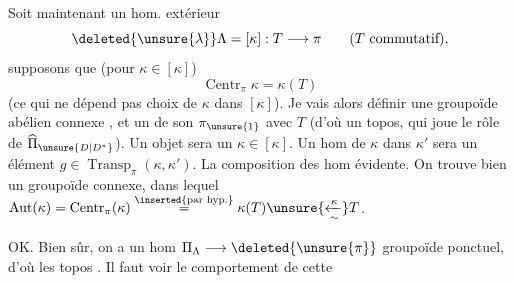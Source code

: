 Soit maintenant un hom. extérieur 
\[
\deleted{\unsure{\lambda}}\Lambda=[\kappa]:T\longrightarrow\pi
\qquad (T\text{ commutatif}),
\]
supposons que (pour \(\kappa\in[\kappa]\))
\[
\operatorname{Centr}_\pi\kappa=\kappa(T)
\]
(ce qui ne dépend pas  choix de \(\kappa\) dans
\([\kappa]\)). Je vais alors définir une
 groupoïde abélien connexe \inserted{\(\Pi_\Lambda\)}, et un
 de son \(\pi_{\unsure{1}}\) avec \(T\) 
(d'où un topos, qui joue le rôle de
\(\widehat{\Pi}_{\unsure{D|D^*}}\)). Un objet sera un \(\kappa\in[\kappa]\).
Un hom de \(\kappa\) dans \(\kappa'\) sera un
élément \(g\in\operatorname{Transp}_\pi(\kappa,\kappa')\). 
La composition des hom évidente. On
trouve bien un groupoïde connexe, dans
lequel \(\operatorname{Aut}(\kappa)=\operatorname{Centr}_\pi(\kappa)\overset{\inserted{\text{par hyp.}}}{=}\kappa(T)\unsure{\xleftarrow[\sim]{\kappa}}T\).

OK. Bien sûr, on a un hom
\(\Pi_\Lambda\longrightarrow\deleted{\unsure{\pi}}\) groupoïde ponctuel, d'où
 les topos   .
Il faut voir le comportement de cette

